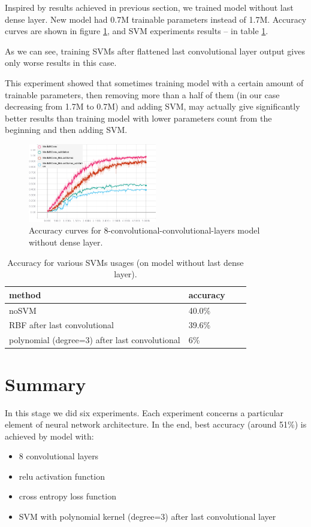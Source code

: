 \documentclass[a4paper]{article}
\begin{document}
Inspired by results achieved in previous section,
we trained model without last dense layer.
New model had 0.7M trainable parameters instead of 1.7M.
Accuracy curves are shown in figure \ref{fig:noDense},
and SVM experiments results -- in table \ref{table:svm2}.

As we can see, training SVMs after flattened last convolutional
layer output gives only worse results in this case.

This experiment showed that sometimes training model with a certain
amount of trainable parameters, then removing more than a half
of them (in our case decreasing from 1.7M to 0.7M) and adding SVM,
may actually give significantly better results than training model with lower
parameters count from the beginning and then adding SVM.

\begin{figure}[!h]
    \centering
    \includegraphics[page=2,width=0.5\textwidth]{noDense.png}
    \caption[]{Accuracy curves for 8-convolutional-convolutional-layers model without dense layer.
    \label{fig:noDense}
    }
\end{figure}

\begin{table}[!hbt]
    \caption{Accuracy for various SVMs usages (on model without last dense layer).
    \label{table:svm2}
    }
\begin{center}
    \begin{tabular}{| l | l | l | l |}
    \hline
    method&accuracy \\
    \hline
        noSVM & 40.0\% \\
        RBF after last convolutional & 39.6\% \\
        polynomial (degree=3) after last convolutional & 6\% \\
    \hline
    \end{tabular}
\end{center}
\end{table}

\section{Summary}
In this stage we did six experiments. Each experiment concerns
a particular element of neural network architecture.
In the end, best accuracy (around 51\%) is achieved by model with:
\begin{itemize}
    \item 8 convolutional layers
    \item relu activation function
    \item cross entropy loss function
    \item SVM with polynomial kernel (degree=3) after last convolutional layer
\end{itemize}
\end{document}
